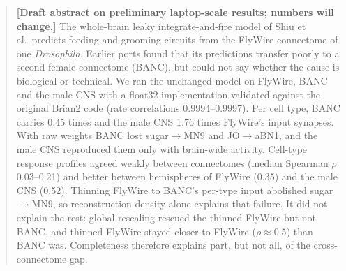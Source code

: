 \begin{abstract}
\textbf{[Draft abstract on preliminary laptop-scale results; numbers will change.]}
The whole-brain leaky integrate-and-fire model of Shiu et al.\ predicts feeding and grooming
circuits from the FlyWire connectome of one \textit{Drosophila}. Earlier ports found that
its predictions transfer poorly to a second female connectome (BANC), but could not say
whether the cause is biological or technical. We ran the unchanged model on FlyWire, BANC
and the male CNS with a float32 implementation validated against the original Brian2 code
(rate correlations 0.9994--0.9997). Per cell type, BANC carries 0.45 times and the male CNS
1.76 times FlyWire's input synapses. With raw weights BANC lost sugar$\to$MN9 and
JO$\to$aBN1, and the male CNS reproduced them only with brain-wide activity. Cell-type
response profiles agreed weakly between connectomes (median Spearman $\rho$ 0.03--0.21)
and better between hemispheres of FlyWire (0.35) and the male CNS (0.52). Thinning FlyWire
to BANC's per-type input abolished sugar$\to$MN9, so reconstruction density alone explains
that failure. It did not explain the rest: global rescaling rescued the thinned FlyWire but
not BANC, and thinned FlyWire stayed closer to FlyWire ($\rho\approx0.5$) than BANC was.
Completeness therefore explains part, but not all, of the cross-connectome gap.
\end{abstract}
